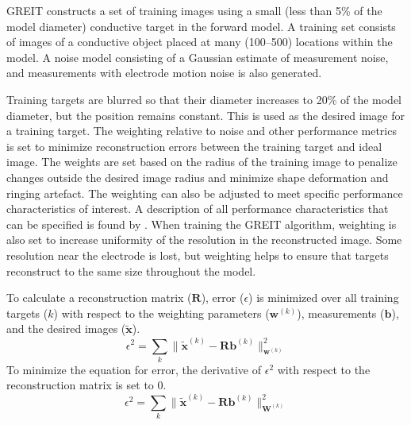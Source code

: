 GREIT constructs a set of training images using a small (less than 5\% of the model diameter) 
conductive target in the 
forward model. A training set consists of images of a conductive object
placed at many (100--500) locations within the model. 
A noise model consisting of a Gaussian estimate of measurement noise, 
and measurements with electrode motion noise is also generated. 

Training targets are blurred so that their diameter increases to 20\% of 
the model diameter, but the position remains constant. 
This is used as the desired image for a training target. 
The weighting relative to noise and other performance metrics 
is set to minimize reconstruction errors between the training target and ideal image. 
The weights are set based on the radius of the training image to penalize
changes outside the desired image radius and minimize shape deformation
and ringing artefact. The weighting can also be adjusted to meet specific performance 
characteristics of interest. A description of all performance characteristics that 
can be specified is found by . 
When training the GREIT algorithm, weighting is also set to increase uniformity 
of the resolution in the reconstructed image. Some resolution near the electrode is 
lost, but weighting helps to ensure that targets reconstruct to the same size throughout the model.

To calculate a reconstruction matrix ($\mathbf{R}$), error ($\epsilon$)
is minimized over all training targets ($k$) with respect to the 
weighting parameters ($\mathbf{w}^{(k)}$),
measurements ($\mathbf{b}$), and the desired images ($\mathbf{\tilde{x}}$).
\begin{equation} \label{eq:greit_min}
	\epsilon^2 = \sum_{k} \|\mathbf{\tilde{x}}^{(k)}
    - \mathbf{Rb}^{(k)}\|^{2}_{\mathbf{w}^{(k)}}
\end{equation}
To minimize the equation for error, the derivative of $\epsilon^2$ with respect to the reconstruction 
matrix is set to 0.
\begin{equation} 
	\epsilon^2 = \sum_{k} \|\mathbf{\tilde{x}}^{(k)}
    - \mathbf{Rb}^{(k)}\|^{2}_{\mathbf{W}^{(k)}}
\end{equation}

